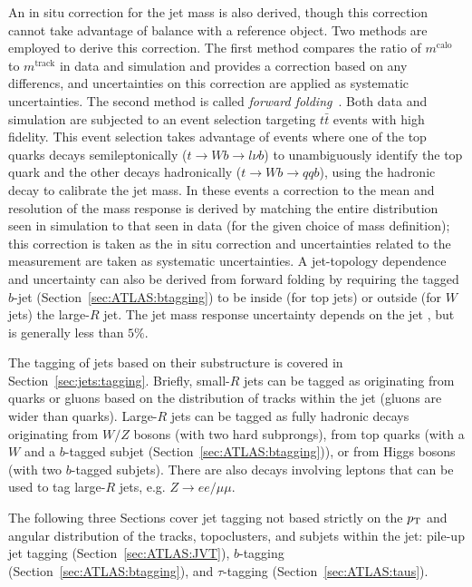 An in situ correction for the jet mass is also derived, though this correction cannot take advantage of \pt{} balance with a reference object.
Two methods are employed to derive this correction.
The first method compares the ratio of $m^\text{calo}$ to $m^\text{track}$ in data and simulation and provides a correction based on any differencs, and uncertainties on this correction are applied as systematic uncertainties.
The second method is called \textit{forward folding}~\cite{ATLAS-CONF-2016-008}.
Both data and simulation are subjected to an event selection targeting $t\bar{t}$ events with high fidelity.
This event selection takes advantage of events where one of the top quarks decays semileptonically ($t\rightarrow Wb \rightarrow l\nu b$) to unambiguously identify the top quark and the other decays hadronically ($t\rightarrow Wb \rightarrow qqb$), using the hadronic decay to calibrate the jet mass.
In these events a correction to the mean and resolution of the mass response is derived by matching the entire distribution seen in simulation to that seen in data (for the given choice of mass definition); this correction is taken as the in situ correction and uncertainties related to the measurement are taken as systematic uncertainties.
A jet-topology dependence and uncertainty can also be derived from forward folding by requiring the tagged $b$-jet (Section~\ref{sec:ATLAS:btagging}) to be inside (for top jets) or outside (for $W$ jets) the large-$R$ jet.
The jet mass response uncertainty depends on the jet \pt{}, but is generally less than $5\%$.

The tagging of jets based on their substructure is covered in Section~\ref{sec:jets:tagging}.
Briefly, small-$R$ jets can be tagged as originating from quarks or gluons based on the distribution of tracks within the jet (gluons are wider than quarks).
Large-$R$ jets can be tagged as fully hadronic decays originating from $W/Z$ bosons (with two hard subprongs), from top quarks (with a $W$ and a $b$-tagged subjet (Section~\ref{sec:ATLAS:btagging})), or from Higgs bosons (with two $b$-tagged subjets).
There are also decays involving leptons that can be used to tag large-$R$ jets, e.g. $Z\rightarrow ee/\mu\mu$.

The following three Sections cover jet tagging not based strictly on the $p_{\text{T}}$ and angular distribution of the tracks, topoclusters, and subjets within the jet: pile-up jet tagging (Section~\ref{sec:ATLAS:JVT}), $b$-tagging (Section~\ref{sec:ATLAS:btagging}), and $\tau$-tagging (Section~\ref{sec:ATLAS:taus}).

